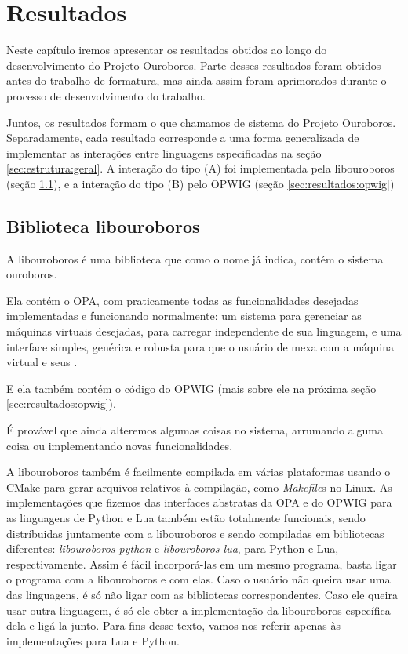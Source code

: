\chapter{Resultados}
\label{sec:resultados}

Neste capítulo iremos apresentar os resultados obtidos ao longo do
desenvolvimento do Projeto Ouroboros. Parte desses resultados foram
obtidos antes do trabalho de formatura, mas ainda assim foram aprimorados
durante o processo de desenvolvimento do trabalho.

Juntos, os resultados formam o que chamamos de sistema do Projeto Ouroboros.
Separadamente, cada resultado corresponde a uma forma generalizada de implementar
as interações entre linguagens especificadas na seção \ref{sec:estrutura:geral}.
A interação do tipo (A) foi implementada pela libouroboros (seção 
\ref{sec:resultados:libouroboros}), e a interação do tipo (B) pelo 
OPWIG (seção \ref{sec:resultados:opwig})


\section{Biblioteca \textbf{libouroboros}}
\label{sec:resultados:libouroboros}
A libouroboros é uma biblioteca \CXX{} que como o nome já indica, contém
o sistema ouroboros.

Ela contém o OPA, com praticamente todas as funcionalidades desejadas 
implementadas e funcionando normalmente: um sistema para gerenciar as máquinas
virtuais desejadas, para carregar  independente de sua
linguagem, e uma interface simples, genérica e robusta para
que o usuário de \CXX{} mexa com a máquina virtual e seus .

E ela também contém o código do OPWIG (mais sobre ele na próxima seção
\ref{sec:resultados:opwig}).

É provável que ainda alteremos algumas coisas no sistema, arrumando alguma
coisa ou implementando novas funcionalidades.

A libouroboros também é facilmente compilada em várias plataformas usando
o CMake para gerar arquivos relativos à compilação, como \textit{Makefile}s
no Linux. As implementações que fizemos das interfaces abstratas da OPA e do 
OPWIG para as linguagens de \script{} Python e Lua também estão totalmente funcionais,
sendo distríbuidas juntamente com a libouroboros e sendo compiladas em
bibliotecas diferentes: \emph{libouroboros-python} e \emph{libouroboros-lua},
para Python e Lua, respectivamente. Assim é fácil incorporá-las em um
mesmo programa, basta ligar o programa com a libouroboros e com elas. 
Caso o usuário não queira usar uma das linguagens, é só não ligar com 
as bibliotecas correspondentes. Caso ele queira usar outra linguagem, é
só ele obter a implementação da libouroboros específica dela e ligá-la junto.
Para fins desse texto, vamos nos referir apenas às implementações para
Lua e Python.

